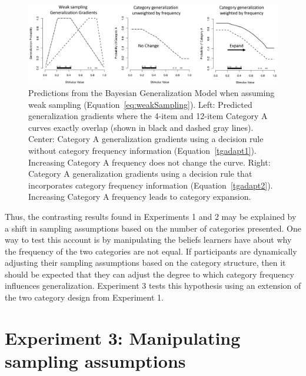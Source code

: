 \documentclass[doc,apacite]{apa6}
\begin{document}
\begin{figure}[t]
\includegraphics[width=1.0\textwidth]{figures/weakSamplingBayesianPredictions.png}
\vspace{-1mm}
\caption{%
Predictions from the Bayesian Generalization Model when assuming weak sampling (Equation~\ref{eq:weakSampling}). Left: Predicted generalization gradients where the 4-item and 12-item Category A curves exactly overlap (shown in black and dashed gray lines). Center: Category A generalization gradients using a decision rule without category frequency information (Equation~\ref{tgadapt1}). Increasing Category A frequency does not change the curve. Right: Category A generalization gradients using a decision rule that incorporates category frequency information (Equation~\ref{tgadapt2}). Increasing Category A frequency leads to category expansion.
}
\label{fig:weakBayesianModelPredictions}
\end{figure}


Thus, the contrasting results found in Experiments 1 and 2 may be explained by a shift in sampling assumptions based on the number of categories presented.  One way to test this account is by manipulating the beliefs learners have about why the frequency of the two categories are not equal.  If participants are dynamically adjusting their sampling assumptions based on the category structure, then it should be expected that they can adjust the degree to which category frequency influences generalization.  Experiment 3 tests this hypothesis using an extension of the two category design from Experiment 1.

\section{Experiment 3: Manipulating sampling assumptions}
\end{document}
